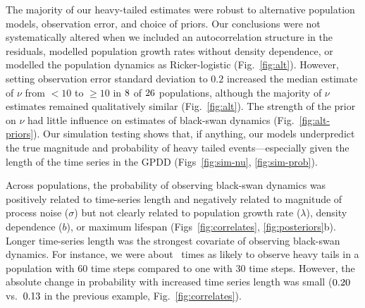 The majority of our heavy-tailed estimates were robust to alternative
population models, observation error, and choice of priors. Our conclusions
were not systematically altered when we included an autocorrelation structure
in the residuals, modelled population growth rates without density dependence,
or modelled the population dynamics as Ricker-logistic (Fig.~\ref{fig:alt}).
However, setting observation error standard deviation to $0.2$ increased the
median estimate of $\nu$ from $<10$ to $\ge 10$ in $8$ of
$26$ populations, although the majority of $\nu$ estimates remained
qualitatively similar (Fig.~\ref{fig:alt}). The strength of the prior on $\nu$
had little influence on estimates of black-swan dynamics
(Fig.~\ref{fig:alt-priors}). Our simulation testing shows that, if anything,
our models underpredict the true magnitude and probability of heavy tailed
events---especially given the length of the time series in the GPDD
(Figs~\ref{fig:sim-nu}, \ref{fig:sim-prob}).

Across populations, the probability of observing black-swan dynamics was
positively related to time-series length and negatively related to magnitude of
process noise ($\sigma$) but not clearly related to population growth rate
($\lambda$), density dependence ($b$), or maximum lifespan
(Figs~\ref{fig:correlates}, \ref{fig:posteriors}b). Longer time-series length
was the strongest covariate of observing black-swan dynamics. For instance, we
were about \pIncHeavyNThirtyNSixty~times as likely to observe heavy tails in a
population with 60 time steps compared to one with 30 time steps. However, the
absolute change in probability with increased time series length was small
($0.20$ vs.\ $0.13$ in the previous example,
Fig.~\ref{fig:correlates}).

